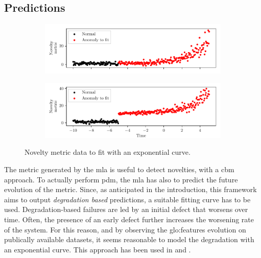 \subsection{Predictions}
\label{sec:predictions}
\begin{figure}
    \centering
    \begin{subfigure}{\textwidth}
        \includegraphics[width=\linewidth]{images/Framework/EXP_1.pdf}
        \caption{}
        \label{fig:exp_degradation_1}
    \end{subfigure}
    \begin{subfigure}{\textwidth}
        \includegraphics[width=\linewidth]{images/Framework/EXP_2.pdf}
        \caption{}
        \label{fig:exp_degradation_2}
    \end{subfigure}
    \caption{Novelty metric data to fit with an exponential curve.}
    \label{fig:mainfig}
    \label{fig:exp_degradation}
\end{figure}

The metric generated by the \gls{mla} is useful to detect novelties, with a \gls{cbm} approach. To actually perform \gls{pdm}, the \gls{mla} has also to predict the future evolution of the metric. Since, as anticipated in the introduction, this framework aims to output \emph{degradation based} predictions, a suitable fitting curve has to be used. Degradation-based failures are led by an initial defect that worsens over time. Often, the presence of an early defect further increases the worsening rate of the system. For this reason, and by observing the \gls{glo:feature}s evolution on publically available datasets, it seems reasonable to model the degradation with an exponential curve. This approach has been used in \cite{exp_degradation} and \cite{exp_degradation_NeuralNN}.

